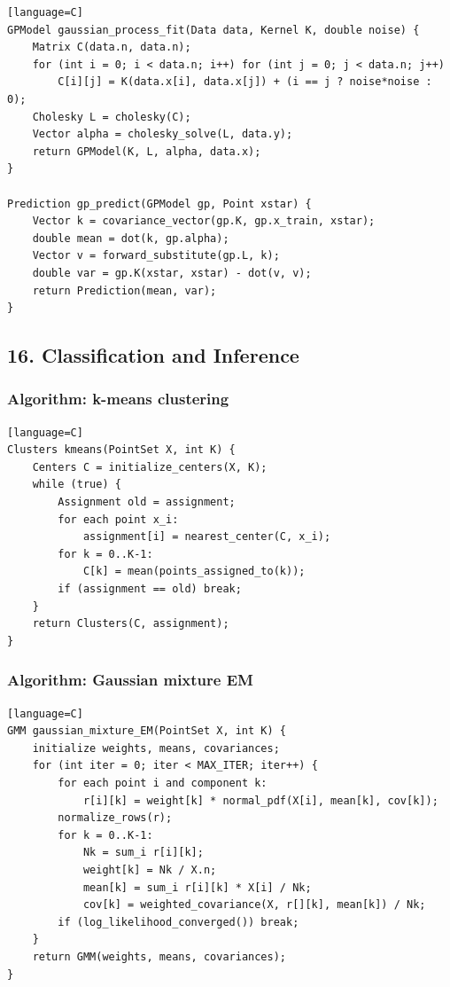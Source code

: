 \documentclass[11pt]{article}
\begin{document}
\begin{verbatim}[language=C]
GPModel gaussian_process_fit(Data data, Kernel K, double noise) {
    Matrix C(data.n, data.n);
    for (int i = 0; i < data.n; i++) for (int j = 0; j < data.n; j++)
        C[i][j] = K(data.x[i], data.x[j]) + (i == j ? noise*noise : 0);
    Cholesky L = cholesky(C);
    Vector alpha = cholesky_solve(L, data.y);
    return GPModel(K, L, alpha, data.x);
}

Prediction gp_predict(GPModel gp, Point xstar) {
    Vector k = covariance_vector(gp.K, gp.x_train, xstar);
    double mean = dot(k, gp.alpha);
    Vector v = forward_substitute(gp.L, k);
    double var = gp.K(xstar, xstar) - dot(v, v);
    return Prediction(mean, var);
}
\end{verbatim}

\subsection{16. Classification and Inference}\label{classification-and-inference}

\subsubsection{Algorithm: k-means clustering}\label{algorithm-k-means-clustering}

\begin{verbatim}[language=C]
Clusters kmeans(PointSet X, int K) {
    Centers C = initialize_centers(X, K);
    while (true) {
        Assignment old = assignment;
        for each point x_i:
            assignment[i] = nearest_center(C, x_i);
        for k = 0..K-1:
            C[k] = mean(points_assigned_to(k));
        if (assignment == old) break;
    }
    return Clusters(C, assignment);
}
\end{verbatim}

\subsubsection{Algorithm: Gaussian mixture EM}\label{algorithm-gaussian-mixture-em}

\begin{verbatim}[language=C]
GMM gaussian_mixture_EM(PointSet X, int K) {
    initialize weights, means, covariances;
    for (int iter = 0; iter < MAX_ITER; iter++) {
        for each point i and component k:
            r[i][k] = weight[k] * normal_pdf(X[i], mean[k], cov[k]);
        normalize_rows(r);
        for k = 0..K-1:
            Nk = sum_i r[i][k];
            weight[k] = Nk / X.n;
            mean[k] = sum_i r[i][k] * X[i] / Nk;
            cov[k] = weighted_covariance(X, r[][k], mean[k]) / Nk;
        if (log_likelihood_converged()) break;
    }
    return GMM(weights, means, covariances);
}
\end{verbatim}
\end{document}
